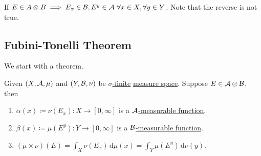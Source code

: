 \begin{prev}
	If \(E\in A\otimes B\implies E_{x} \in \mathcal{\MakeUppercase{b}} , E^y\in \mathcal{\MakeUppercase{a}}\ \forall x\in X, \forall y\in Y\).
	Note that the reverse is not true.
\end{prev}

\subsection{Fubini-Tonelli Theorem}
We start with a theorem.

\begin{theorem}\label{thm:Tonelli-for-characteristic-functions}
	Given \((X, \mathcal{\MakeUppercase{a}} , \mu )\) and \((Y, \mathcal{\MakeUppercase{b}} , \nu )\) be \hyperref[def:finite-measure]{\(\sigma\)-finite}
	\hyperref[def:measure-space]{measure space}. Suppose \(E\in \mathcal{\MakeUppercase{a}} \otimes \mathcal{\MakeUppercase{b}} \), then
	\begin{enumerate}
		\item \(\alpha (x)\coloneqq \nu (E_x)\colon X\to [0, \infty ]\) is a \hyperref[def:A-measurable-function]{\(\mathcal{\MakeUppercase{a}}\)-measurable function}.
		\item \(\beta (x)\coloneqq \mu (E^y)\colon Y\to [0, \infty ]\) is a \hyperref[def:A-measurable-function]{\(\mathcal{\MakeUppercase{b}}\)-measurable function}.
		\item \((\mu \times \nu) (E) = \int_X \nu (E_x)\,\mathrm{d} \mu(x) = \int _Y \mu (E^y)\,\mathrm{d} \nu (y)\).
	\end{enumerate}
\end{theorem}
